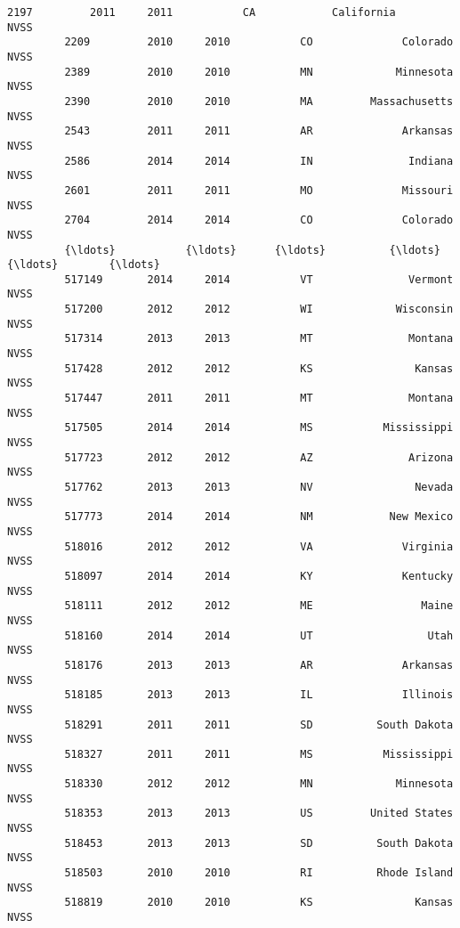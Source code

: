 \documentclass[11pt]{article}
\begin{document}
\begin{Verbatim}[commandchars=\\\{\}]
         2197         2011     2011           CA            California       NVSS   
         2209         2010     2010           CO              Colorado       NVSS   
         2389         2010     2010           MN             Minnesota       NVSS   
         2390         2010     2010           MA         Massachusetts       NVSS   
         2543         2011     2011           AR              Arkansas       NVSS   
         2586         2014     2014           IN               Indiana       NVSS   
         2601         2011     2011           MO              Missouri       NVSS   
         2704         2014     2014           CO              Colorado       NVSS   
         {\ldots}           {\ldots}      {\ldots}          {\ldots}                   {\ldots}        {\ldots}   
         517149       2014     2014           VT               Vermont       NVSS   
         517200       2012     2012           WI             Wisconsin       NVSS   
         517314       2013     2013           MT               Montana       NVSS   
         517428       2012     2012           KS                Kansas       NVSS   
         517447       2011     2011           MT               Montana       NVSS   
         517505       2014     2014           MS           Mississippi       NVSS   
         517723       2012     2012           AZ               Arizona       NVSS   
         517762       2013     2013           NV                Nevada       NVSS   
         517773       2014     2014           NM            New Mexico       NVSS   
         518016       2012     2012           VA              Virginia       NVSS   
         518097       2014     2014           KY              Kentucky       NVSS   
         518111       2012     2012           ME                 Maine       NVSS   
         518160       2014     2014           UT                  Utah       NVSS   
         518176       2013     2013           AR              Arkansas       NVSS   
         518185       2013     2013           IL              Illinois       NVSS   
         518291       2011     2011           SD          South Dakota       NVSS   
         518327       2011     2011           MS           Mississippi       NVSS   
         518330       2012     2012           MN             Minnesota       NVSS   
         518353       2013     2013           US         United States       NVSS   
         518453       2013     2013           SD          South Dakota       NVSS   
         518503       2010     2010           RI          Rhode Island       NVSS   
         518819       2010     2010           KS                Kansas       NVSS   

\end{Verbatim}
\end{document}
